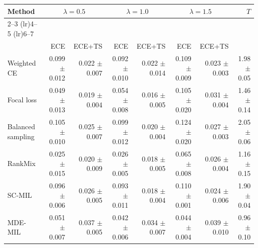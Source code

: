 \begin{tabular}{lrrrrrrr}
\toprule
Method & \multicolumn{2}{c}{$\lambda=0.5$} & \multicolumn{2}{c}{$\lambda=1.0$} & \multicolumn{2}{c}{$\lambda=1.5$} & $T$ \\ \cmidrule(lr){2--3} \cmidrule(lr){4--5} \cmidrule(lr){6--7}\\
 & ECE & ECE+TS & ECE & ECE+TS & ECE & ECE+TS & \\
\midrule
Weighted CE & \num{0.099} $\pm$ \num{0.012} & \num{0.022} $\pm$ \num{0.007} & \num{0.092} $\pm$ \num{0.010} & \num{0.022} $\pm$ \num{0.014} & \num{0.109} $\pm$ \num{0.009} & \num{0.023} $\pm$ \num{0.003} & \num{1.98} $\pm$ \num{0.05}\\
Focal loss & \num{0.049} $\pm$ \num{0.013} & \num{0.019} $\pm$ \num{0.004} & \num{0.054} $\pm$ \num{0.008} & \num{0.016} $\pm$ \num{0.005} & \num{0.105} $\pm$ \num{0.020} & \num{0.031} $\pm$ \num{0.004} & \num{1.46} $\pm$ \num{0.14}\\
Balanced sampling & \num{0.105} $\pm$ \num{0.010} & \num{0.025} $\pm$ \num{0.007} & \num{0.099} $\pm$ \num{0.012} & \num{0.020} $\pm$ \num{0.004} & \num{0.124} $\pm$ \num{0.020} & \num{0.027} $\pm$ \num{0.003} & \num{2.05} $\pm$ \num{0.06}\\
RankMix & \num{0.025} $\pm$ \num{0.015} & \num{0.020} $\pm$ \num{0.009} & \num{0.026} $\pm$ \num{0.005} & \num{0.018} $\pm$ \num{0.005} & \num{0.065} $\pm$ \num{0.008} & \num{0.026} $\pm$ \num{0.004} & \num{1.16} $\pm$ \num{0.15}\\
SC-MIL & \num{0.096} $\pm$ \num{0.006} & \num{0.026} $\pm$ \num{0.005} & \num{0.093} $\pm$ \num{0.011} & \num{0.018} $\pm$ \num{0.004} & \num{0.110} $\pm$ \num{0.001} & \num{0.024} $\pm$ \num{0.006} & \num{1.90} $\pm$ \num{0.04}\\
MDE-MIL & \num{0.051} $\pm$ \num{0.007} & \num{0.037} $\pm$ \num{0.005} & \num{0.042} $\pm$ \num{0.006} & \num{0.034} $\pm$ \num{0.007} & \num{0.044} $\pm$ \num{0.004} & \num{0.039} $\pm$ \num{0.010} & \num{0.96} $\pm$ \num{0.10}\\
\bottomrule
\end{tabular}
